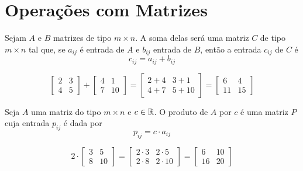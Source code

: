 \section{Operações com Matrizes}

\begin{def:adicao de matrizes}
Sejam $A$ e $B$	matrizes de tipo $m \times n$.
A soma delas será uma matriz $C$ de tipo $m \times n$ tal que, se $a_{ij}$ é entrada de
$A$ e $b_{ij}$ entrada de $B$, então a entrada $c_{ij}$ de $C$ é
\[
	c_{ij} = a_{ij} + b_{ij}
\]
\end{def:adicao de matrizes}

\begin{exp:soma matrizes}
\[
	\begin{bmatrix}
		2 & 3 \\
		4 & 5
	\end{bmatrix} +
	\begin{bmatrix}
		4 & 1  \\
		7 & 10
	\end{bmatrix} =
	\begin{bmatrix}
		2 + 4 & 3 + 1  \\
		4 + 7 & 5 + 10
	\end{bmatrix} =
	\begin{bmatrix}
		6  & 4  \\
		11 & 15
	\end{bmatrix}
\]
\end{exp:soma matrizes}

\begin{def:produto escalar matriz}
Seja $A$ uma matriz do tipo $m \times n$ e $c \in \mathbb{R}$.
O produto de $A$ por $c$ é uma matriz $P$ cuja entrada $p_{ij}$ é dada por
\[
	p_{ij} = c \cdot a_{ij}
\]
\end{def:produto escalar matriz}

\begin{exp:produto escalar matriz}
\[
	2 \cdot \begin{bmatrix}
		3 & 5  \\
		8 & 10
	\end{bmatrix} =
	\begin{bmatrix}
		2 \cdot 3 & 2 \cdot 5  \\
		2 \cdot 8 & 2 \cdot 10
	\end{bmatrix} =
	\begin{bmatrix}
		6  & 10 \\
		16 & 20
	\end{bmatrix}
\]
\end{exp:produto escalar matriz}

